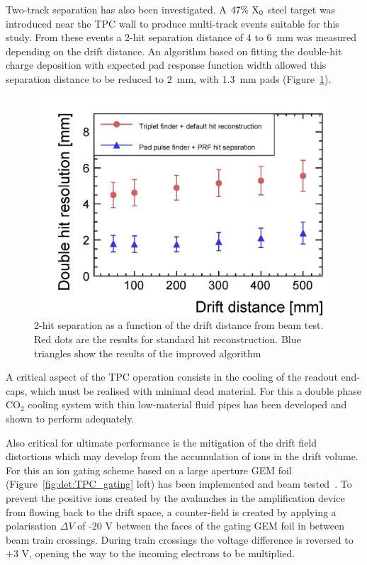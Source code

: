Two-track separation has also been investigated. A $47\%~\rm{X_0}$ steel target was introduced near the TPC wall to produce multi-track events suitable for this study.
From these events a 2-hit separation distance of 4 to 6~mm was measured depending on the drift distance. An algorithm based on fitting the double-hit charge deposition with expected pad response function width allowed this separation distance to be reduced to 2~mm, with 1.3~mm pads (Figure~\ref{fig:det:TPC_separation}).

\begin{figure}[t!]
\centering
\includegraphics[width=0.7\hsize]{Detector/fig/TPC_separation.jpg}
\caption{2-hit separation as a function of the drift distance from beam test. Red dots are the results for standard hit reconstruction. Blue triangles show the results of the improved algorithm}
\label{fig:det:TPC_separation}
\end{figure}

A critical aspect of the TPC operation consists in the cooling of the readout end-caps, which must be realised with minimal dead material.  For this a double phase $\mathrm{CO}_2$ cooling system with thin low-material fluid pipes has been developed and shown to perform adequately. 

Also critical for ultimate performance is the mitigation of the drift field distortions which may develop from the accumulation of ions in the drift volume. For this an ion gating scheme based on a large aperture GEM foil (Figure~\ref{fig:det:TPC_gating} left) has been implemented and beam tested~\cite{ild:bib:TPC_gatinginbeam}. To prevent the positive ions created by the avalanches in the amplification device from flowing back to the drift space, a counter-field is created by applying a polarisation $\Delta V$ of -20 V between the faces of the gating GEM foil in between beam train crossings. During train crossings the voltage difference is reversed to +3 V, opening the way to the incoming electrons to be multiplied. 

